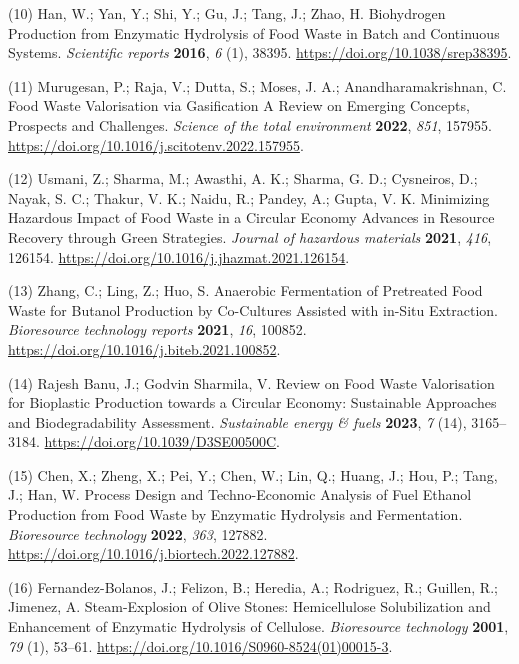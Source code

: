 \documentclass[11pt]{article}
\begin{document}
\hypertarget{citeproc_bib_item_10}{(10) Han, W.; Yan, Y.; Shi, Y.; Gu, J.; Tang, J.; Zhao, H. Biohydrogen Production from Enzymatic Hydrolysis of Food Waste in Batch and Continuous Systems. \textit{Scientific reports} \textbf{2016}, \textit{6} (1), 38395. \url{https://doi.org/10.1038/srep38395}.}

\hypertarget{citeproc_bib_item_11}{(11) Murugesan, P.; Raja, V.; Dutta, S.; Moses, J. A.; Anandharamakrishnan, C. Food Waste Valorisation via Gasification A Review on Emerging Concepts, Prospects and Challenges. \textit{Science of the total environment} \textbf{2022}, \textit{851}, 157955. \url{https://doi.org/10.1016/j.scitotenv.2022.157955}.}

\hypertarget{citeproc_bib_item_12}{(12) Usmani, Z.; Sharma, M.; Awasthi, A. K.; Sharma, G. D.; Cysneiros, D.; Nayak, S. C.; Thakur, V. K.; Naidu, R.; Pandey, A.; Gupta, V. K. Minimizing Hazardous Impact of Food Waste in a Circular Economy Advances in Resource Recovery through Green Strategies. \textit{Journal of hazardous materials} \textbf{2021}, \textit{416}, 126154. \url{https://doi.org/10.1016/j.jhazmat.2021.126154}.}

\hypertarget{citeproc_bib_item_13}{(13) Zhang, C.; Ling, Z.; Huo, S. Anaerobic Fermentation of Pretreated Food Waste for Butanol Production by Co-Cultures Assisted with in-Situ Extraction. \textit{Bioresource technology reports} \textbf{2021}, \textit{16}, 100852. \url{https://doi.org/10.1016/j.biteb.2021.100852}.}

\hypertarget{citeproc_bib_item_14}{(14) Rajesh Banu, J.; Godvin Sharmila, V. Review on Food Waste Valorisation for Bioplastic Production towards a Circular Economy: Sustainable Approaches and Biodegradability Assessment. \textit{Sustainable energy \& fuels} \textbf{2023}, \textit{7} (14), 3165–3184. \url{https://doi.org/10.1039/D3SE00500C}.}

\hypertarget{citeproc_bib_item_15}{(15) Chen, X.; Zheng, X.; Pei, Y.; Chen, W.; Lin, Q.; Huang, J.; Hou, P.; Tang, J.; Han, W. Process Design and Techno-Economic Analysis of Fuel Ethanol Production from Food Waste by Enzymatic Hydrolysis and Fermentation. \textit{Bioresource technology} \textbf{2022}, \textit{363}, 127882. \url{https://doi.org/10.1016/j.biortech.2022.127882}.}

\hypertarget{citeproc_bib_item_16}{(16) Fernandez-Bolanos, J.; Felizon, B.; Heredia, A.; Rodriguez, R.; Guillen, R.; Jimenez, A. Steam-Explosion of Olive Stones: Hemicellulose Solubilization and Enhancement of Enzymatic Hydrolysis of Cellulose. \textit{Bioresource technology} \textbf{2001}, \textit{79} (1), 53–61. \url{https://doi.org/10.1016/S0960-8524(01)00015-3}.}
\end{document}
